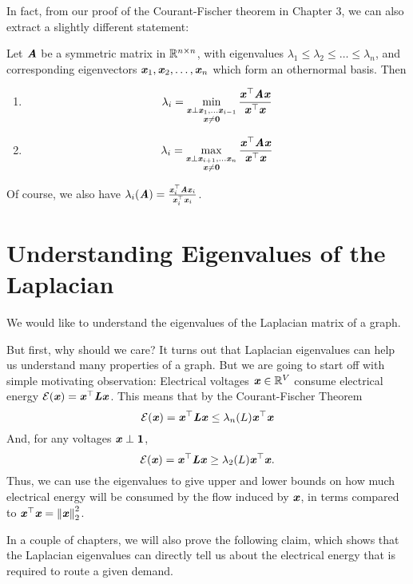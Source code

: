 In fact, from our proof of the Courant-Fischer theorem in Chapter 3,
we can also extract a slightly different statement: 

\begin{theorem}
  \label{thm:courant-fischeragain-eigvec}
  Let $\AA$ be a symmetric matrix in $\R^{n\times n}$, with
  eigenvalues $\lambda_1\leq \lambda_2 \leq \ldots \leq \lambda_n$,
  and corresponding eigenvectors $\xx_1, \xx_2, \ldots, \xx_n$ which
  form an othernormal basis.
  Then
  \begin{enumerate}
  \item
  \label{thm:courant-fischeragain-eigvec:minmax}
    \[
    \lambda_i =
    \min_{
      \substack{ \xx \perp \xx_1, \ldots \xx_{i-1}
        \\ \xx \neq \veczero}
    }
    \frac{\xx^\trp \AA\xx}{\xx^\trp\xx}
  \]
\item
  \label{thm:courant-fischeragain2:maxmin}
    \[
    \lambda_i =
    \max_{
      \substack{  \xx \perp \xx_{i+1}, \ldots \xx_{n}
        \\ \xx \neq \veczero}
    }
    \frac{\xx^\trp \AA\xx}{\xx^\trp\xx}
    \]
  \end{enumerate}
\end{theorem}

Of course, we also have $\lambda_i(\AA) = \frac{\xx_i ^\trp \AA \xx_i
}{\xx_i^\trp\xx_i}$.
\section{Understanding Eigenvalues of the Laplacian}
We would like to understand the eigenvalues of the Laplacian matrix of
a graph.

But first, why should we care? It turns out that Laplacian eigenvalues can help
us understand many properties of a graph.
But we are going to start off with simple motivating observation: Electrical
voltages $\xx \in \R^V$ consume electrical energy $\energy(\xx) =
\xx^{\trp} \LL \xx$.
This means that by the Courant-Fischer Theorem
\[
  \energy(\xx) =
  \xx^{\trp} \LL \xx \leq \lambda_n(L)  \xx^{\trp} \xx
\]
And, for any voltages $\xx \perp \vecone$, 
\[
  \energy(\xx) =
  \xx^{\trp} \LL \xx \geq \lambda_2(L)  \xx^{\trp} \xx.
\]
Thus, we can use the eigenvalues to give upper and lower bounds on how
much electrical energy will be consumed by the flow induced by $\xx$,
in terms compared to $\xx^{\trp} \xx = \norm{\xx}_2^2$.

In a couple of chapters, we will also prove the following claim, which
shows that the Laplacian eigenvalues can directly tell us about the
electrical energy that is required to route a given demand.


